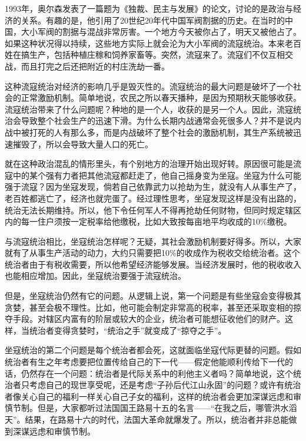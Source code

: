 1993年，奥尔森发表了一篇题为《独裁、民主与发展》的论文，讨论的是政治与经济的关系。有趣的是，他引用了20世纪20年代中国军阀割据的历史。在当时的中国，大小军阀的割据与混战非常厉害。一个地方今天被你占了，明天又被他占了。如果这种状况得以持续，这些地方实际上就会沦为大小军阀的流寇统治。本来老百姓在搞生产，包括种植庄稼和饲养家畜等。突然，流寇来了。流寇们不仅互相交战，而且打完之后还把附近的村庄洗劫一番。

这种流寇统治对经济的影响几乎是毁灭性的。流寇统治的最大问题是破坏了一个社会的正常激励机制。简单地说，农民之所以春天播种，是因为预期秋天能够收获。流寇统治带来了什么问题呢？种地的是一个人，收获的是另一个人。因此，流寇统治会导致整个社会生产的迅速下滑。为什么长期内战通常会死很多人？并不是说内战中被打死的人有那么多，而是内战破坏了整个社会的激励机制，其生产系统被迅速摧毁了，所以会导致大量人口的死亡。

就在这种政治混乱的情形里头，有个别地方的治理开始出现好转。原因很可能是流寇中的某个强有力者把其他流寇都赶走了，他自己摇身变为坐寇。坐寇为什么可能强于流寇？因为坐寇发现，倘若自己依靠武力以抢劫为生，就没有人从事生产了，老百姓都逃亡了，经济也就完蛋了。经过理性思考，坐寇发现这样是没有出路的，统治无法长期维持。所以，他下令任何军人不得再抢劫任何财物，但同时规定辖区内的每一住户须按一定税率给他缴税，比如大致按每亩地平均收成的10\%缴税。

与流寇统治相比，坐寇统治怎样呢？无疑，其社会激励机制要好得多。所以，大家就有了从事生产活动的动力，大约只需要把10\%的收成作为税收交给统治者。这个统治者由于有税收需要，所以他希望经济能够发展。当经济发展时，他的税收收入也能相应增加。因此，坐寇统治要强于流寇统治。

但是，坐寇统治仍然有它的问题。从逻辑上说，第一个问题是有些坐寇会变得极其贪婪，甚至会极不理性。比如，他可能会制定非常高的税率，甚至还采取变相的掠夺手段。对辖区内富有的阶层或较大的企业，统治者可能想征收他们的财产。这样，当统治者变得贪婪时，“统治之手”就变成了“掠夺之手”。

坐寇统治的第二个问题是每个统治者都会死，这就面临坐寇代际更替的问题。假如统治者有生之年考虑要把位置传给自己的下一代——假定他能顺利传给下一代的话，仍然存在一个问题：统治者是代际关系中的利他主义者吗？简单地说，这个统治者只考虑自己的现世享受呢，还是考虑“子孙后代江山永固”的问题？或许有统治者像关心自己的福利一样关心自己子女的福利，这样的统治者会更加深谋远虑和审慎节制。但是，大家都听过法国国王路易十五的名言——“在我之后，哪管洪水滔天”。结果，在路易十六的时代，法国大革命就爆发了。所以，统治者并非总能做到深谋远虑和审慎节制。

